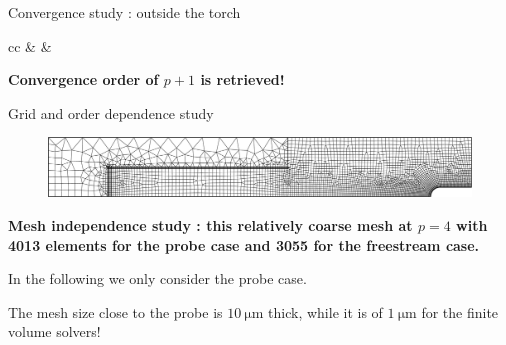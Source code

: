 \documentclass[24pt,t,table, aspectratio=169]{beamer}
\begin{document}
\begin{frame}{Convergence study : outside the torch}

\centering

\begin{tabular}{cc}
{
\hspace{-1.3cm} & 
}
{
\hspace{-1.5cm} & 
}
\end{tabular}

\begin{framed}
\centering
\textbf{Convergence order of $p+1$ is retrieved!}
\end{framed}

\end{frame}

\begin{frame}{Grid and order dependence study}

\begin{figure}[h]
	\centering
	\includegraphics[width=\linewidth]{./Grid_Independence_mesh_probe_cropped.pdf}
\end{figure} 

{
\begin{framed}
\centering
\textbf{Mesh independence study : this relatively coarse mesh at $p=4$ with 4013 elements for the probe case and 3055 for the freestream case.}
\end{framed}

In the following we only consider the probe case.

}

{
The mesh size close to the probe is $\SI{10}{\micro\meter}$ thick, while it is of $\SI{1}{\micro\meter}$ for the finite volume solvers!
}

\end{frame}
\end{document}
